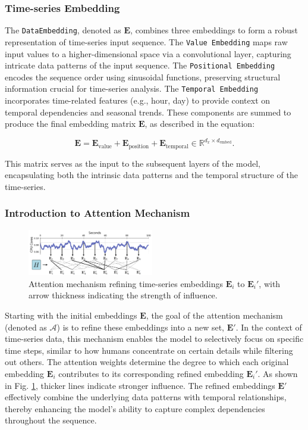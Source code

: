 
\subsubsection*{Time-series Embedding}

The \texttt{DataEmbedding}, denoted as $\mathbf{E}$, combines three embeddings to form a robust representation of time-series input sequence. The \texttt{Value Embedding} maps raw input values to a higher-dimensional space via a convolutional layer, capturing intricate data patterns of the input sequence. The \texttt{Positional Embedding} encodes the sequence order using sinusoidal functions, preserving structural information crucial for time-series analysis. The \texttt{Temporal Embedding} incorporates time-related features (e.g., hour, day) to provide context on temporal dependencies and seasonal trends. These components are summed to produce the final embedding matrix $\mathbf{E}$, as described in the equation:

\begin{equation}
\mathbf{E} = \mathbf{E}_{\text{value}} + \mathbf{E}_{\text{position}} + \mathbf{E}_{\text{temporal}} \in \mathbb{R}^{d_x \times d_{\text{embed}}}.
\end{equation}

This matrix serves as the input to the subsequent layers of the model, encapsulating both the intrinsic data patterns and the temporal structure of the time-series.

\subsubsection*{Introduction to Attention Mechanism}

\begin{figure}
\centering
\includegraphics[width=0.49\textwidth]{img/attention_goal.pdf}
\caption{Attention mechanism refining time-series embeddings $\mathbf{E}_i$ to $\mathbf{E}_i'$, with arrow thickness indicating the strength of influence.}
\label{fig:attention_goal}
\end{figure}

Starting with the initial embeddings $\mathbf{E}$, the goal of the attention mechanism (denoted as $\mathcal{A}$) is to refine these embeddings into a new set, $\mathbf{E}'$. In the context of time-series data, this mechanism enables the model to selectively focus on specific time steps, similar to how humans concentrate on certain details while filtering out others. The attention weights determine the degree to which each original embedding $\mathbf{E}_i$ contributes to its corresponding refined embedding $\mathbf{E}_i'$. As shown in Fig. \ref{fig:attention_goal}, thicker lines indicate stronger influence. The refined embeddings $\mathbf{E}'$ effectively combine the underlying data patterns with temporal relationships, thereby enhancing the model's ability to capture complex dependencies throughout the sequence.

